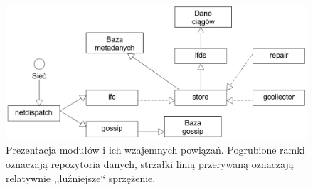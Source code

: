 \documentclass[a4paper,polish,12pt,twoside]{article}
\begin{document}
	\begin{figure}[h]
		\centering \includegraphics[width=15cm]{general_structure}
		\caption[Prezentacja modułów i ich wzajemnych powiązań]{Prezentacja modułów i ich wzajemnych powiązań. Pogrubione ramki oznaczają repozytoria danych, strzałki linią przerywaną oznaczają relatywnie ,,luźniejsze`` sprzężenie.}
		\label{fig:general_structure}
	\end{figure}
\end{document}
